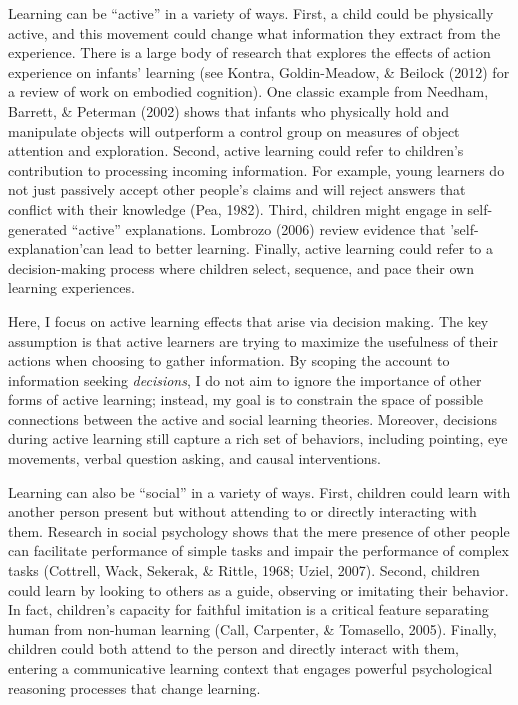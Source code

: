 \documentclass[oneside]{report}
\begin{document}
Learning can be ``active'' in a variety of ways. First, a child could be
physically active, and this movement could change what information they
extract from the experience. There is a large body of research that
explores the effects of action experience on infants' learning (see
Kontra, Goldin-Meadow, \& Beilock (2012) for a review of work on
embodied cognition). One classic example from Needham, Barrett, \&
Peterman (2002) shows that infants who physically hold and manipulate
objects will outperform a control group on measures of object attention
and exploration. Second, active learning could refer to children's
contribution to processing incoming information. For example, young
learners do not just passively accept other people's claims and will
reject answers that conflict with their knowledge (Pea, 1982). Third,
children might engage in self-generated ``active'' explanations.
Lombrozo (2006) review evidence that 'self-explanation'can lead to
better learning. Finally, active learning could refer to a
decision-making process where children select, sequence, and pace their
own learning experiences.

Here, I focus on active learning effects that arise via decision making.
The key assumption is that active learners are trying to maximize the
usefulness of their actions when choosing to gather information. By
scoping the account to information seeking \emph{decisions}, I do not
aim to ignore the importance of other forms of active learning; instead,
my goal is to constrain the space of possible connections between the
active and social learning theories. Moreover, decisions during active
learning still capture a rich set of behaviors, including pointing, eye
movements, verbal question asking, and causal interventions.

Learning can also be ``social'' in a variety of ways. First, children
could learn with another person present but without attending to or
directly interacting with them. Research in social psychology shows that
the mere presence of other people can facilitate performance of simple
tasks and impair the performance of complex tasks (Cottrell, Wack,
Sekerak, \& Rittle, 1968; Uziel, 2007). Second, children could learn by
looking to others as a guide, observing or imitating their behavior. In
fact, children's capacity for faithful imitation is a critical feature
separating human from non-human learning (Call, Carpenter, \& Tomasello,
2005). Finally, children could both attend to the person and directly
interact with them, entering a communicative learning context that
engages powerful psychological reasoning processes that change learning.
\end{document}
